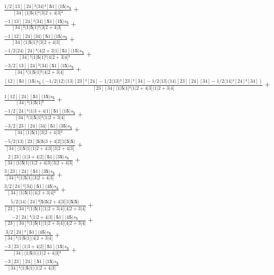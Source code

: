 \documentclass[varwidth, border=5pt]{standalone}
\begin{document}
\begin{my}
$\begin{gathered}
\scriptscriptstyle\frac{1/2[13][24]²⟨34⟩²[𝟓1]⟨1𝟓⟩s_{𝟓}}{[34]⟨1|𝟓|1]²⟨3|2+4|3]²} +\\
\scriptscriptstyle\frac{-1[13][24]²⟨34⟩[𝟓1]⟨1𝟓⟩s_{𝟓}}{[34]²⟨1|𝟓|1]²⟨3|2+4|3]} +\\
\scriptscriptstyle\frac{-1[12][24]⟨34⟩[𝟓1]⟨1𝟓⟩s_{𝟓}}{[34]⟨1|𝟓|1]²⟨3|2+4|3]} +\\
\scriptscriptstyle\frac{-1/2⟨24⟩[24]³⟨4|2+3|1][𝟓1]⟨1𝟓⟩s_{𝟓}}{[34]²⟨1|𝟓|1]²⟨4|2+3|4]²} +\\
\scriptscriptstyle\frac{-3/2[13][24]²⟨34⟩[𝟓1]⟨1𝟓⟩s_{𝟓}}{[34]²⟨1|𝟓|1]²⟨4|2+3|4]} +\\
\scriptscriptstyle\frac{[12][𝟓1]⟨1𝟓⟩s_{𝟓}(-1/2⟨12⟩⟨13⟩[23]²[24]-1/2⟨13⟩²[23]²[34]-1/2⟨13⟩⟨14⟩[23][24][34]-1/2⟨14⟩²[24]²[34])}{[23][34]⟨1|𝟓|1]²⟨1|2+4|3]⟨1|2+3|4]} +\\
\scriptscriptstyle\frac{1[12][24][𝟓1]⟨1𝟓⟩s_{𝟓}}{[34]²⟨1|𝟓|1]²} +\\
\scriptscriptstyle\frac{-1/2[24]²⟨1|3+4|1][𝟓1]⟨1𝟓⟩s_{𝟓}}{[34]²⟨1|𝟓|1]²⟨1|2+3|4]} +\\
\scriptscriptstyle\frac{-3/2[23][24]⟨34⟩[𝟓1]⟨3𝟓⟩s_{𝟓}}{[34]⟨1|𝟓|1]⟨3|2+4|3]²} +\\
\scriptscriptstyle\frac{-5/2⟨13⟩[23][𝟓|𝟓|3+4|2][1|𝟓|𝟓⟩}{[34]⟨1|𝟓|1]⟨1|2+4|3]⟨3|2+4|3]} +\\
\scriptscriptstyle\frac{2[23]⟨1|3+4|2][𝟓1]⟨3𝟓⟩s_{𝟓}}{[34]⟨1|𝟓|1]⟨1|2+4|3]⟨3|2+4|3]} +\\
\scriptscriptstyle\frac{3[23][24][𝟓1]⟨3𝟓⟩s_{𝟓}}{[34]²⟨1|𝟓|1]⟨3|2+4|3]} +\\
\scriptscriptstyle\frac{3/2[24]²⟨34⟩[𝟓1]⟨4𝟓⟩s_{𝟓}}{[34]⟨1|𝟓|1]⟨4|2+3|4]²} +\\
\scriptscriptstyle\frac{5/2⟨14⟩[24]³[𝟓|𝟓|2+4|3][1|𝟓|𝟓⟩}{[23][34]²⟨1|𝟓|1]⟨1|2+3|4]⟨4|2+3|4]} +\\
\scriptscriptstyle\frac{-2[24]³⟨1|2+4|3][𝟓1]⟨4𝟓⟩s_{𝟓}}{[23][34]²⟨1|𝟓|1]⟨1|2+3|4]⟨4|2+3|4]} +\\
\scriptscriptstyle\frac{3/2[24]²[𝟓1]⟨4𝟓⟩s_{𝟓}}{[34]²⟨1|𝟓|1]⟨4|2+3|4]} +\\
\scriptscriptstyle\frac{-3[23]⟨1|3+4|2][𝟓1]⟨1𝟓⟩s_{𝟓}}{[34]⟨1|𝟓|1]⟨1|2+4|3]²} +\\
\scriptscriptstyle\frac{-3[23][24][𝟓1]⟨1𝟓⟩s_{𝟓}}{[34]²⟨1|𝟓|1]⟨1|2+4|3]} \phantom{+}
\end{gathered}$
\end{my}
\end{document}
